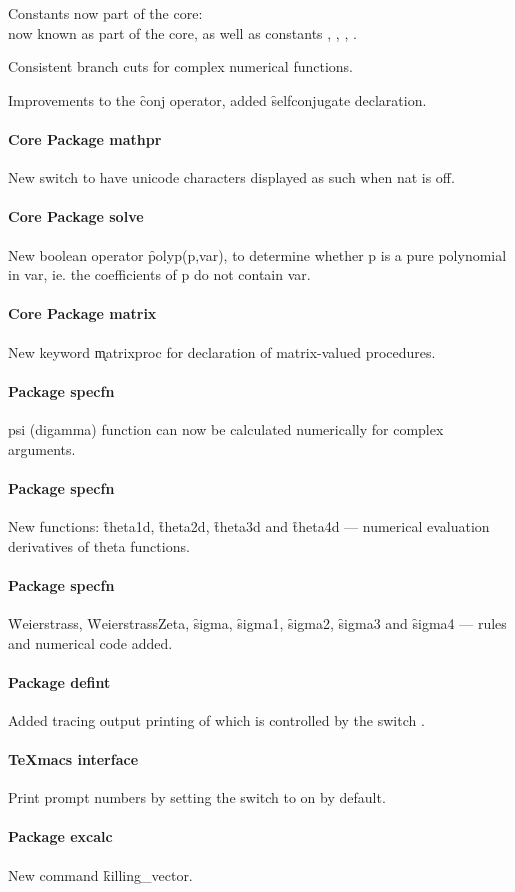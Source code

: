 Constants now part of the core:\\
 now known as part of the
core, as well as constants , , ,
.

Consistent branch cuts for complex numerical functions.

Improvements to the \f{conj} operator, added \f{selfconjugate} declaration.

\paragraph*{Core Package mathpr}

New switch  to have unicode characters
displayed as such when nat is off.

\paragraph*{Core Package solve}

New boolean operator \f{polyp}(p,var), to determine whether p is a pure polynomial
in var, ie. the coefficients of p do not contain var.

\paragraph*{Core Package matrix}

New keyword \k{matrixproc} for declaration of matrix-valued procedures.

\paragraph{Package specfn}

psi (digamma) function can now be calculated numerically for complex arguments.

\paragraph{Package specfn}

New functions: \f{theta1d}, \f{theta2d}, \f{theta3d} and \f{theta4d}
--- numerical evaluation derivatives of theta functions.

\paragraph{Package specfn}

\f{Weierstrass}, \f{WeierstrassZeta}, \f{sigma}, \f{sigma1}, \f{sigma2},
\f{sigma3} and \f{sigma4}  --- rules and numerical code added.

\paragraph{Package defint}

Added tracing output printing of which is controlled by the switch .

\paragraph{TeXmacs interface}

Print prompt numbers by setting the switch  to on by default.

\paragraph{Package excalc}

New command \f{killing\_vector}.

